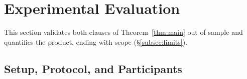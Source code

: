 ﻿%
\section{Experimental Evaluation}
\label{sec:experimental_evaluation}

\raggedbottom

This section validates both clauses of Theorem~\ref{thm:main} out of sample
and quantifies the product, ending with scope (\S\ref{subsec:limits}).

\subsection{Setup, Protocol, and Participants}
\label{subsec:setup}

